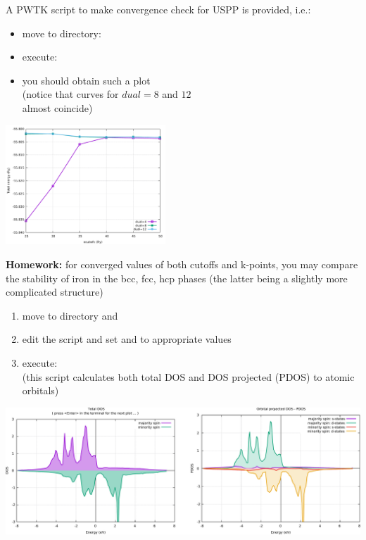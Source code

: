 \documentclass[landscape]{foils}
\begin{document}

A PWTK script to make convergence check for USPP is provided, i.e.:

\parbox{0.55\textwidth}{
\begin{itemize}
\item move to directory:\\ 
\item execute: ~
\item you should obtain such a plot\\
  {\small (notice that curves for $dual=8$ and $12$\\almost coincide)}
\end{itemize}
}\parbox{0.45\textwidth}{
  \begin{flushright}
    \includegraphics[width=0.45\textwidth]{figs/fe-dual+k-points.pdf}
  \end{flushright}
}
\vfill
{\bf Homework:} for converged values of both cutoffs and k-points, you may
  compare the stability of iron in the bcc, fcc, hcp
  phases (the latter being a slightly more complicated structure)

%
\begin{enumerate}
\item move to  directory and
\item edit the  script and set  and
   to appropriate values
\item execute: ~\\
  {\small (this script calculates both total DOS and DOS projected (PDOS) to
  atomic orbitals)}
\end{enumerate}
\centerline{\includegraphics[width=1.0\textwidth]{figs/fe-dos+pdos.pdf}}
\end{document}

